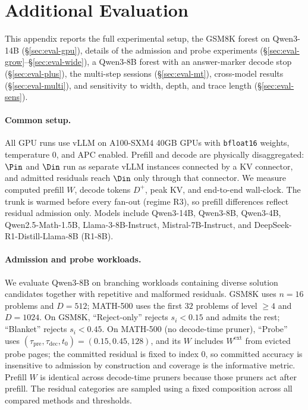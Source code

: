 \section{Additional Evaluation}
\label{sec:eval-full}

This appendix reports the full experimental setup, the GSM8K forest on Qwen3-14B (\S\ref{sec:eval-gpu}), details of the admission and probe experiments (\S\ref{sec:eval-grow}--\S\ref{sec:eval-wide}), a Qwen3-8B forest with an answer-marker decode stop (\S\ref{sec:eval-plus}), the multi-step sessions (\S\ref{sec:eval-mt}), cross-model results (\S\ref{sec:eval-multi}), and sensitivity to width, depth, and trace length (\S\ref{sec:eval-sens}).

\paragraph{Common setup.}
\label{sec:eval-setup}
All GPU runs use vLLM on A100-SXM4 40GB GPUs with \texttt{bfloat16} weights, temperature $0$, and APC enabled.
Prefill and decode are physically disaggregated: $\Pin$ and $\Din$ run as separate vLLM instances connected by a KV connector, and admitted residuals reach $\Din$ only through that connector.
We measure computed prefill $W$, decode tokens $D^{+}$, peak KV, and end-to-end wall-clock.
The trunk is warmed before every fan-out (regime R3), so prefill differences reflect residual admission only.
Models include Qwen3-14B, Qwen3-8B, Qwen3-4B, Qwen2.5-Math-1.5B, Llama-3-8B-Instruct, Mistral-7B-Instruct, and DeepSeek-R1-Distill-Llama-8B (R1-8B).

\paragraph{Admission and probe workloads.}
We evaluate Qwen3-8B on branching workloads containing diverse solution candidates together with repetitive and malformed residuals.
GSM8K uses $n{=}16$ problems and $D{=}512$; MATH-500 uses the first $32$ problems of level $\ge4$ and $D{=}1024$.
On GSM8K, ``Reject-only'' rejects $s_i{<}0.15$ and admits the rest; ``Blanket'' rejects $s_i{<}0.45$.
On MATH-500 (no decode-time pruner), ``Probe'' uses $(\tau_{\mathrm{pre}},\tau_{\mathrm{dec}},t_0)=(0.15,0.45,128)$, and its $W$ includes $W^{\mathrm{ext}}$ from evicted probe pages; the committed residual is fixed to index $0$, so committed accuracy is insensitive to admission by construction and coverage is the informative metric.
Prefill $W$ is identical across decode-time pruners because those pruners act after prefill.
The residual categories are sampled using a fixed composition across all compared methods and thresholds.

